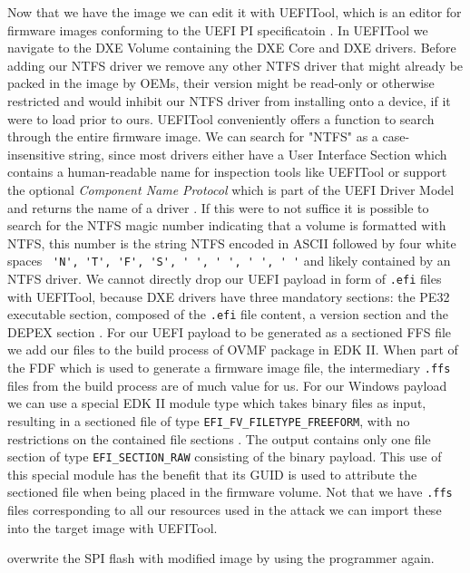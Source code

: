 Now that we have the image we can edit it with UEFITool, which is an editor for firmware images conforming to the \ac{UEFI} \ac{PI} specificatoin \cite{uefitool}.
In UEFITool we navigate to the \ac{DXE} Volume containing the \ac{DXE} Core and \ac{DXE} drivers.
Before adding our \ac{NTFS} driver we remove any other \ac{NTFS} driver that might already be packed in the image by \acp{OEM}, their version might be read-only or otherwise restricted and would inhibit our \ac{NTFS} driver from installing onto a device, if it were to load prior to ours.
UEFITool conveniently offers a function to search through the entire firmware image.
We can search for "NTFS" as a case-insensitive string, since most drivers either have a User Interface Section which contains a human-readable name for inspection tools like UEFITool \cite[Vol 3, 3.2.5]{pi-spec} or support the optional \emph{Component Name Protocol} which is part of the \ac{UEFI} Driver Model and returns the name of a driver \cite[11.5]{uefi-spec}.
If this were to not suffice it is possible to search for the \ac{NTFS} magic number indicating that a volume is formatted with \ac{NTFS}, this number is the string \ac{NTFS} encoded in \ac{ASCII} followed by four white spaces \lstinline{ 'N', 'T', 'F', 'S', ' ', ' ', ' ', ' '} and likely contained by an \ac{NTFS} driver.
We cannot directly drop our \ac{UEFI} payload in form of \lstinline{.efi} files with UEFITool, because \ac{DXE} drivers have three mandatory sections: the \ac{PE32} executable section, composed of the \lstinline{.efi} file content, a version section and the \ac{DEPEX} section \cite[Vol 3, 2.1.4.1.4]{pi-spec}.
For our \ac{UEFI} payload to be generated as a sectioned \ac{FFS} file we add our files to the build process of \ac{OVMF} package in \ac{EDK} II. When part of the \ac{FDF} which is used to generate a firmware image file, the intermediary \lstinline{.ffs} files from the build process are of much value for us.
For our Windows payload we can use a special \ac{EDK} II module type which takes binary files as input, resulting in a sectioned file of type \lstinline{EFI_FV_FILETYPE_FREEFORM}, with no restrictions on the contained file sections \cite[Vol 3, 2.1.4.1.7]{pi-spec}.
The output contains only one file section of type \lstinline{EFI_SECTION_RAW} consisting of the binary payload.
This use of this special module has the benefit that its \ac{GUID} is used to attribute the sectioned file when being placed in the firmware volume.
Not that we have \lstinline{.ffs} files corresponding to all our resources used in the attack we can import these into the target image with UEFITool.

overwrite the SPI flash with modified image by using the programmer again.